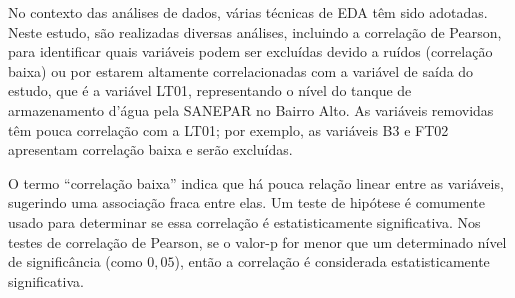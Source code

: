 No contexto das análises de dados, várias técnicas de EDA têm sido adotadas. Neste estudo, são realizadas diversas análises, incluindo a correlação de Pearson, para identificar quais variáveis podem ser excluídas devido a ruídos (correlação baixa) ou por estarem altamente correlacionadas com a variável de saída do estudo, que é a variável LT01, representando o nível do tanque de armazenamento d'água pela SANEPAR no Bairro Alto. As variáveis removidas têm pouca correlação com a LT01; por exemplo, as variáveis B3 e FT02 apresentam correlação baixa e serão excluídas.

O termo ``correlação baixa'' indica que há pouca relação linear entre as variáveis, sugerindo uma associação fraca entre elas. Um teste de hipótese é comumente usado para determinar se essa correlação é estatisticamente significativa. Nos testes de correlação de Pearson, se o valor-p for menor que um determinado nível de significância (como $0,05$), então a correlação é considerada estatisticamente significativa.


